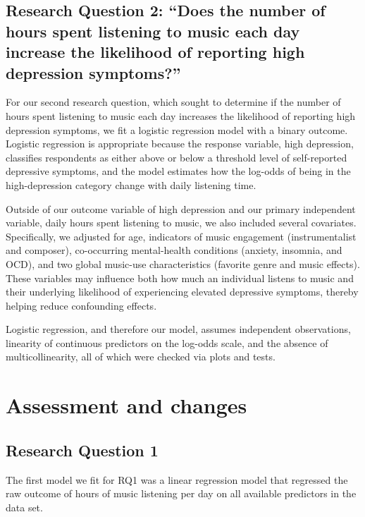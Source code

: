 \documentclass[
  letterpaper,
  DIV=11,
  numbers=noendperiod]{scrartcl}
\begin{document}
\subsection{Research Question 2: ``Does the number of hours spent
listening to music each day increase the likelihood of reporting high
depression
symptoms?''}\label{research-question-2-does-the-number-of-hours-spent-listening-to-music-each-day-increase-the-likelihood-of-reporting-high-depression-symptoms}

For our second research question, which sought to determine if the
number of hours spent listening to music each day increases the
likelihood of reporting high depression symptoms, we fit a logistic
regression model with a binary outcome. Logistic regression is
appropriate because the response variable, high depression, classifies
respondents as either above or below a threshold level of self-reported
depressive symptoms, and the model estimates how the log-odds of being
in the high-depression category change with daily listening time.

Outside of our outcome variable of high depression and our primary
independent variable, daily hours spent listening to music, we also
included several covariates. Specifically, we adjusted for age,
indicators of music engagement (instrumentalist and composer),
co-occurring mental-health conditions (anxiety, insomnia, and OCD), and
two global music-use characteristics (favorite genre and music effects).
These variables may influence both how much an individual listens to
music and their underlying likelihood of experiencing elevated
depressive symptoms, thereby helping reduce confounding effects.

Logistic regression, and therefore our model, assumes independent
observations, linearity of continuous predictors on the log-odds scale,
and the absence of multicollinearity, all of which were checked via
plots and tests.

\section{Assessment and changes}\label{assessment-and-changes}

\subsection{Research Question 1}\label{research-question-1}

The first model we fit for RQ1 was a linear regression model that
regressed the raw outcome of hours of music listening per day on all
available predictors in the data set.
\end{document}
